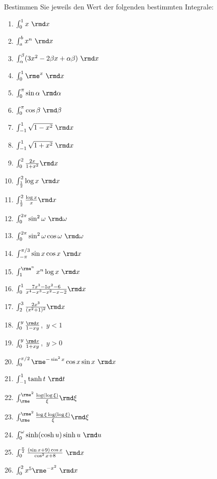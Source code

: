 Bestimmen Sie jeweils den Wert der folgenden bestimmten Integrale:\\
\parbox{0.5\textwidth}{\begin{enumerate}
\item $\int_0^1 x~\rmd x$  
\item $\int_a^b x^n~\rmd x$
\item $\int_\alpha^\beta (3x^2-2\beta x+\alpha\beta)~\rmd x$  
\item $\int_0^1 \rme^x~\rmd x$ 
\item $\int_0^\pi \sin\alpha~\rmd\alpha$  
\item $\int_0^\pi \cos\beta~\rmd\beta$  
\item $\int_{-1}^1\sqrt{1-x^2}~\rmd x$  
\item $\int_{-1}^1\sqrt{1+x^2}~\rmd x$  
\item $\int_0^2 \frac{2x}{1+x^2}\rmd x$  
\item $\int_{\frac{1}{2}}^2\log x~\rmd x$  
\item $\int_{\frac{1}{2}}^2\frac{\log x}{x}\rmd x$  
\item $\int_0^{2\pi}\sin^2\omega~\rmd\omega$  
\item $\int_0^{2\pi}\sin^2\omega\cos\omega~\rmd\omega$  
\end{enumerate}}\parbox{0.5\textwidth}{\begin{enumerate}\setcounter{enumi}{13}
\item $\int_{-\pi}^{\pi/3}\sin x\cos x~\rmd x$  
\item $\int_1^{\rme^n} x^n\log x~\rmd x$  
\item $\int_0^1 \frac{7 x^3-5 x^2-6}{x^4-x^3-x^2-x-2}\rmd x$  
\item $\int_2^3 \frac{2 x^3}{(x^2+1)^2}\rmd x$  
\item $\int_0^y \frac{\rmd x}{1-xy}$,~$y<1$
\item $\int_0^y \frac{\rmd x}{1+xy}$,~$y>0$
\item $\int_0^{\pi/2}\rme^{-\sin^2 x}\cos x\sin x~\rmd x$  
\item $\int_{-1}^1\tanh t~\rmd t$  
\item $\int_\rme^{\rme^2}\frac{\log(\log \xi)}{\xi}\rmd\xi$  
\item $\int_\rme^{\rme^2}\frac{\log\xi \log(\log \xi)}{\xi}\rmd\xi$  
\item $\int_0^\omega \sinh(\cosh u)\sinh u~\rmd u$  
\item $\int_0^{\frac{\pi }{2}} \frac{(\sin x+9) \cos x}{\cos^2 x +8}~\rmd x$  
\item $\int_0^2 x^5\rme^{-x^2}~\rmd x$  
\end{enumerate}}



